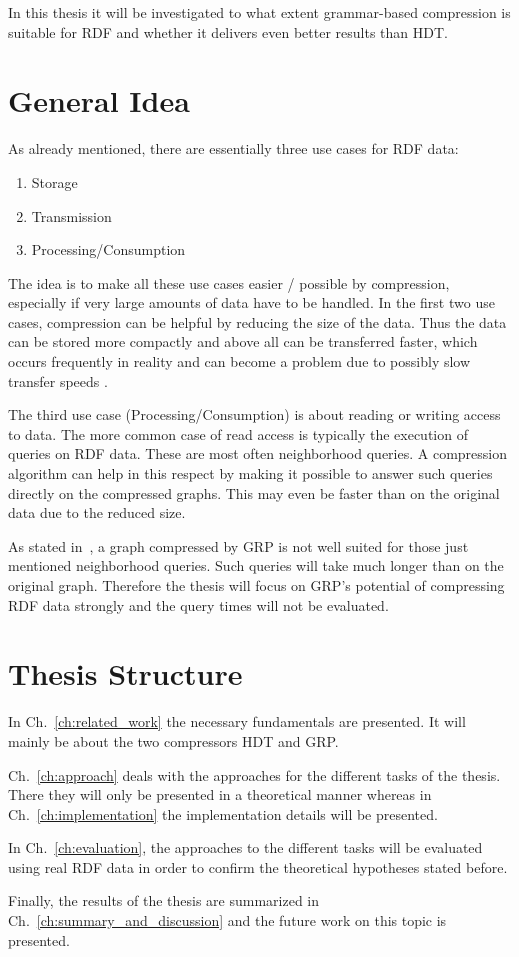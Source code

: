 In this thesis it will be investigated to what extent grammar-based compression is suitable for RDF and whether it delivers even better results than HDT.


\section{General Idea}

As already mentioned, there are essentially three use cases for RDF data:

\begin{enumerate}
	\item Storage
	\item Transmission
	\item Processing/Consumption
\end{enumerate}

The idea is to make all these use cases easier / possible by compression, especially if very large amounts of data have to be handled. In the first two use cases, compression can be helpful by reducing the size of the data. Thus the data can be stored more compactly and above all can be transferred faster, which occurs frequently in reality and can become a problem due to possibly slow transfer speeds .

The third use case (Processing/Consumption) is about reading or writing access to data. The more common case of read access is typically the execution of queries on RDF data. These are most often neighborhood queries. A compression algorithm can help in this respect by making it possible to answer such queries directly on the compressed graphs. This may even be faster than on the original data due to the reduced size.

As stated in~\cite{maneth}, a graph compressed by GRP is not well suited for those just mentioned neighborhood queries. Such queries will take much longer than on the original graph. Therefore the thesis will focus on GRP's potential of compressing RDF data strongly and the query times will not be evaluated.



\section{Thesis Structure}

In Ch.~\ref{ch:related_work} the necessary fundamentals are presented. It will mainly be about the two compressors HDT and GRP. 

Ch.~\ref{ch:approach} deals with the approaches for the different tasks of the thesis. There they will only be presented in a theoretical manner whereas in Ch.~\ref{ch:implementation} the implementation details will be presented.

In Ch.~\ref{ch:evaluation}, the approaches to the different tasks will be evaluated using real RDF data in order to confirm the theoretical hypotheses stated before.

Finally, the results of the thesis are summarized in Ch.~\ref{ch:summary_and_discussion} and the future work on this topic is presented.








